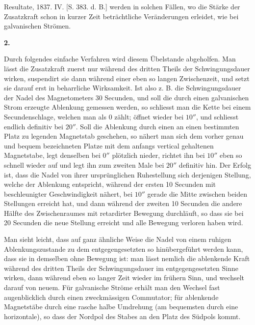 \expandafter\def\csname HistoricalNoteText404\endcsname{Resultate, 1837. IV. [S. 383. d. B.]}
\renewcommand{\Article}[1]{\par\medskip\Needspace{4\baselineskip}\pdfbookmark[1]{#1.}{ablenkungen-art-#1}\centerline{\textbf{#1.}}\nobreak\smallskip}%
werden in solchen Fällen, wo die Stärke der Zusatzkraft schon in kurzer Zeit beträchtliche Veränderungen erleidet, wie bei galvanischen Strömen.

\Article{2}
Durch folgendes einfache Verfahren wird diesem Übelstande abgeholfen. Man lässt die Zusatzkraft zuerst nur während des dritten Theils der Schwingungsdauer wirken, suspendirt sie dann während einer eben so langen Zwischenzeit, und setzt sie darauf erst in beharrliche Wirksamkeit. Ist also z. B. die Schwingungsdauer der Nadel des Magnetometers 30 Secunden, und soll die durch einen galvanischen Strom erzeugte Ablenkung gemessen werden, so schliesst man die Kette bei einem Secundenschlage, welchen man als 0 zählt; öffnet wieder bei $10''$, und schliesst endlich definitiv bei $20''$. Soll die Ablenkung durch einen an einen bestimmten Platz zu legenden Magnetstab geschehen, so nähert man sich dem vorher genau und bequem bezeichneten Platze mit dem anfangs vertical gehaltenen Magnetstabe, legt denselben bei $0''$ plötzlich nieder, richtet ihn bei $10''$ eben so schnell wieder auf und legt ihn zum zweiten Male bei $20''$ definitiv hin. Der Erfolg ist, dass die Nadel von ihrer ursprünglichen Ruhestellung sich derjenigen Stellung, welche der Ablenkung entspricht, während der ersten 10 Secunden mit beschleunigter Geschwindigkeit nähert, bei $10''$ gerade die Mitte zwischen beiden Stellungen erreicht hat, und dann während der zweiten 10 Secunden die andere Hälfte des Zwischenraumes mit retardirter Bewegung durchläuft, so dass sie bei 20 Secunden die neue Stellung erreicht und alle Bewegung verloren haben wird.

Man sieht leicht, dass auf ganz ähnliche Weise die Nadel von einem ruhigen Ablenkungszustande zu dem entgegengesetzten so hinübergeführt werden kann, dass sie in demselben ohne Bewegung ist: man lässt nemlich die ablenkende Kraft während des dritten Theils der Schwingungsdauer im entgegengesetzten Sinne wirken, dann während eben so langer Zeit wieder im frühern Sinn, und wechselt darauf von neuem. Für galvanische Ströme erhält man den Wechsel fast augenblicklich durch einen zweckmässigen Commutator; für ablenkende Magnetstäbe durch eine rasche halbe Umdrehung (am bequemsten durch eine horizontale), so dass der Nordpol des Stabes an den Platz des Südpols kommt.

